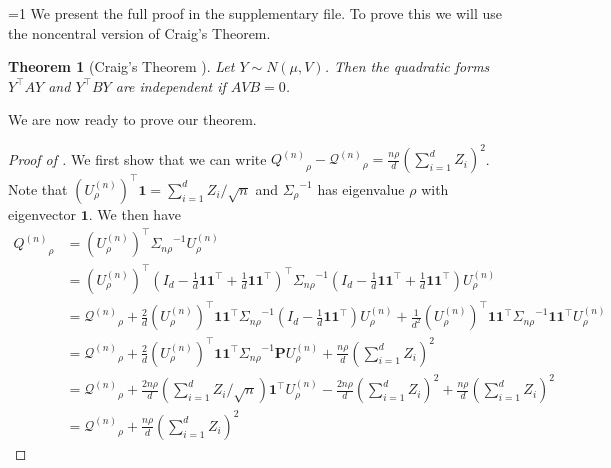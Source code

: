 \documentclass[twoside,letterpaper]{article} \usepackage{aistats2017}
\newtheorem{theorem}{Theorem}[section]
\theoremstyle{definition}
\theoremstyle{remark}
\begin{document}
=1
We present the full proof in the supplementary file.
\else
To prove this we will use the noncentral version of Craig's Theorem.
\begin{theorem}[Craig's Theorem \citep{RD88}]
Let $Y \sim N(\mu,V)$.  Then the quadratic forms $Y^\intercal AY$ and $Y^\intercal BY$ are independent if $AVB = 0$.  
\end{theorem}
We are now ready to prove our theorem.
\begin{proof}[Proof of ]
We first show that we can write ${Q^{({n})}}_\rho - {\pmb{\mathcal{Q}}^{({n})}}_{\rho} = \frac{n\rho}{d} \left(\sum_{i=1}^d Z_i \right)^2$.  Note that $\left({U^{(n)}_{{\rho}}}\right)^\intercal{\pmb{1}} = \sum_{i=1}^d Z_i/\sqrt{n}$ and ${{\Sigma}_{{\rho}}}^{-1}$ has eigenvalue $\rho$ with eigenvector ${\pmb{1}}$.  We then have
\begin{align*}
{Q^{({n})}}_{\rho}& = \left({U^{(n)}_{{\rho}}}\right)^\intercal{{\Sigma}_{{n\rho}}}^{-1} {U^{(n)}_{{\rho}}} \\
& = \left({U^{(n)}_{{\rho}}}\right)^\intercal\left(I_d - \frac{1}{d}{\pmb{1}}{\pmb{1}}^\intercal + \frac{1}{d}{\pmb{1}}{\pmb{1}}^\intercal \right)^\intercal{{\Sigma}_{{n\rho}}}^{-1} \left(I_d - \frac{1}{d}{\pmb{1}}{\pmb{1}}^\intercal + \frac{1}{d}{\pmb{1}}{\pmb{1}}^\intercal \right){U^{(n)}_{{\rho}}} \\
& = {\pmb{\mathcal{Q}}^{({n})}}_{\rho}   + \frac{2}{d} ({U^{(n)}_{{\rho}}})^\intercal {\pmb{1}} {\pmb{1}}^\intercal{{\Sigma}_{{n\rho}}}^{-1}\left(I_d - \frac{1}{d}{\pmb{1}}{\pmb{1}}^\intercal\right){U^{(n)}_{{\rho}}} 
+ \frac{1}{d^2}({U^{(n)}_{{\rho}}})^\intercal {\pmb{1}} {\pmb{1}}^\intercal{{\Sigma}_{{n\rho}}}^{-1}  {\pmb{1}}{\pmb{1}}^\intercal {U^{(n)}_{{\rho}}} \\
& = {\pmb{\mathcal{Q}}^{({n})}}_{\rho} + \frac{2}{d} ({U^{(n)}_{{\rho}}})^\intercal {\pmb{1}} {\pmb{1}}^\intercal{{\Sigma}_{{n\rho}}}^{-1}{\pmb{P}}{U^{(n)}_{{\rho}}} + \frac{n\rho}{d}\left( \sum_{i=1}^d Z_i\right)^2 \\
& = {\pmb{\mathcal{Q}}^{({n})}}_{\rho} + \frac{2n \rho}{d} \left(\sum_{i=1}^d Z_i / \sqrt{n} \right) {\pmb{1}}^\intercal{U^{(n)}_{{\rho}}} - \frac{2n \rho}{d} \left(\sum_{i=1}^d Z_i\right)^2 + \frac{n\rho}{d}\left( \sum_{i=1}^d Z_i\right)^2 \\
& = {\pmb{\mathcal{Q}}^{({n})}}_{\rho} + \frac{n\rho}{d} \left(\sum_{i=1}^d Z_i \right)^2
\end{align*}


\end{proof}
\end{document}

